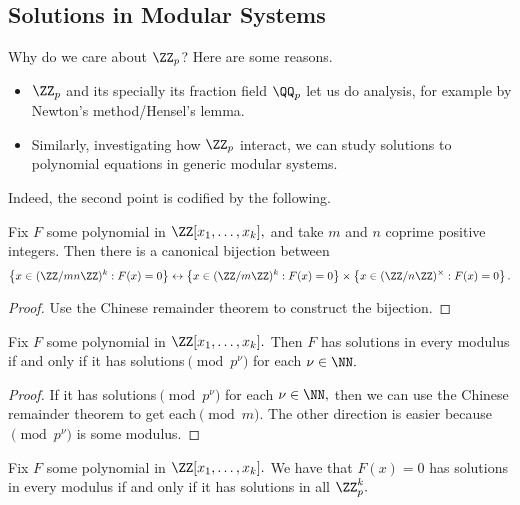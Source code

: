 \documentclass[../notes.tex]{subfiles}
\begin{document}
\subsection{Solutions in Modular Systems}
Why do we care about $\ZZ_p$? Here are some reasons.
\begin{itemize}
	\item $\ZZ_p$ and its specially its fraction field $\QQ_p$ let us do analysis, for example by Newton's method/Hensel's lemma.
	\item Similarly, investigating how $\ZZ_p$ interact, we can study solutions to polynomial equations in generic modular systems.
\end{itemize}
Indeed, the second point is codified by the following.
\begin{proposition}
	Fix $F$ some polynomial in $\ZZ[x_1,\ldots,x_k],$ and take $m$ and $n$ coprime positive integers. Then there is a canonical bijection between
	\[\left\{x\in(\ZZ/mn\ZZ)^k:F(x)=0\right\}\leftrightarrow\left\{x\in(\ZZ/m\ZZ)^k:F(x)=0\right\}\times\left\{x\in(\ZZ/n\ZZ)^\times:F(x)=0\right\}.\]
\end{proposition}
\begin{proof}
	Use the Chinese remainder theorem to construct the bijection.
\end{proof}
\begin{corollary}
	Fix $F$ some polynomial in $\ZZ[x_1,\ldots,x_k].$ Then $F$ has solutions in every modulus if and only if it has solutions$\pmod{p^\nu}$ for each $\nu\in\NN.$
\end{corollary}
\begin{proof}
	If it has solutions$\pmod{p^\nu}$ for each $\nu\in\NN,$ then we can use the Chinese remainder theorem to get each$\pmod m.$ The other direction is easier because$\pmod{p^\nu}$ is some modulus.
\end{proof}
\begin{prop}
	Fix $F$ some polynomial in $\ZZ[x_1,\ldots,x_k].$ We have that $F(x)=0$ has solutions in every modulus if and only if it has solutions in all $\ZZ_p^k.$
\end{prop}
\end{document}
